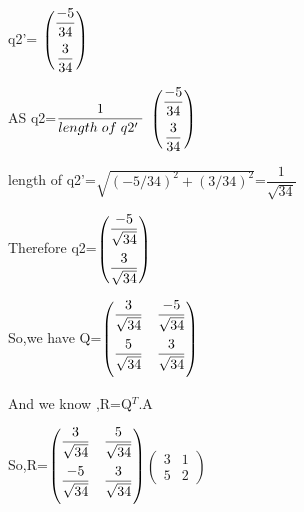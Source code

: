 \documentclass[a4paper,12pt]{article}
\begin{document}
q2'= $\begin{pmatrix} \dfrac{-5}{34} \vspace*{2mm} \\ \dfrac{3}{34} \end{pmatrix}$ \\
\vspace{0.5cm}

AS  q2=$\dfrac{1}{length \hspace{1mm} of \hspace{1mm} q2'\hspace{1mm} }$
$\begin{pmatrix} \dfrac{-5}{34} \vspace*{2mm} \\ \dfrac{3}{34} \end{pmatrix}$ \\
\vspace{0.5cm}

length of q2'=$\sqrt{(-5/34)^2+(3/34)^2}$=$\dfrac{1}{\sqrt{34}}$\\

\vspace{0.5cm}

Therefore q2=$\begin{pmatrix} \dfrac{-5}{\sqrt{34}} \vspace*{2mm} \\ \dfrac{3}{\sqrt{34}} \end{pmatrix}$ \\

\vspace{0.5cm}

So,we have Q=$\begin{pmatrix} \dfrac{3}{\sqrt{34}} \vspace*{2mm} & \dfrac{-5}{\sqrt{34}} \\ \dfrac{5}{\sqrt{34}} \vspace*{2mm} & \dfrac{3}{\sqrt{34}} \end{pmatrix}$\\

\vspace{0.5cm}

And we know ,R=Q$^T$.A\\

\vspace{0.5cm}

So,R=$\begin{pmatrix} \dfrac{3}{\sqrt{34}} \vspace*{2mm} & \dfrac{5}{\sqrt{34}} \\ \dfrac{-5}{\sqrt{34}} \vspace*{2mm} & \dfrac{3}{\sqrt{34}} \end{pmatrix}${\LARGE  $\begin{pmatrix} 3 & 1  \\ 5 & 2 \end{pmatrix}$}\\
\end{document}
